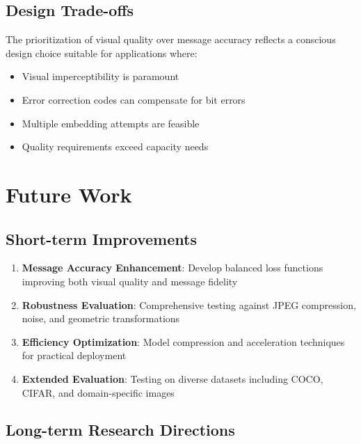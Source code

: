 \documentclass[12pt,a4paper]{report}
\begin{document}
\subsection{Design Trade-offs}

The prioritization of visual quality over message accuracy reflects a conscious design choice suitable for applications where:

\begin{itemize}
    \item Visual imperceptibility is paramount
    \item Error correction codes can compensate for bit errors
    \item Multiple embedding attempts are feasible
    \item Quality requirements exceed capacity needs
\end{itemize}

\section{Future Work}

\subsection{Short-term Improvements}

\begin{enumerate}
    \item \textbf{Message Accuracy Enhancement}: Develop balanced loss functions improving both visual quality and message fidelity
    
    \item \textbf{Robustness Evaluation}: Comprehensive testing against JPEG compression, noise, and geometric transformations
    
    \item \textbf{Efficiency Optimization}: Model compression and acceleration techniques for practical deployment
    
    \item \textbf{Extended Evaluation}: Testing on diverse datasets including COCO, CIFAR, and domain-specific images
\end{enumerate}

\subsection{Long-term Research Directions}
\end{document}
